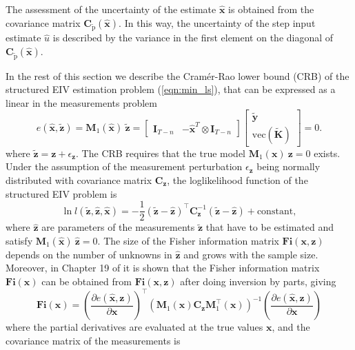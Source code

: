 The assessment of the uncertainty of the estimate $\widehat{\mathbf{x}}$ is obtained from the covariance matrix $\mathrm{\mathbf{C}}_{\widetilde{\mathrm{p}}} \left( \widehat{\mathbf{x}} \right)$. In this way, the uncertainty of the step input estimate $\widehat{u}$ is described by the variance in the first element on the diagonal of $\mathrm{\mathbf{C}}_{\widetilde{\mathrm{p}}} \left( \widehat{\mathbf{x}} \right)$.

In the rest of this section we describe the Cram\'er-Rao lower bound (CRB) of the structured EIV estimation problem (\ref{eqn:min_ls}), that can be expressed as a linear in the measurements problem \cite{Pintelon12Book}
\begin{equation} e (\widehat{\mathbf{x}}, \widetilde{\mathbf{z}}) = \mathbf{M}_1( \widehat{\mathbf{x}} ) \ \widetilde{\mathbf{z}} = \begin{bmatrix} \mathbf{I}_{T-n} & - \widehat{\mathbf{x}}^T \otimes \mathbf{I}_{T-n} \end{bmatrix} \begin{bmatrix} \widetilde{\mathbf{y}} \\ \mathrm{vec} ( \widetilde{\mathbf{K}} ) \end{bmatrix} = 0 . \label{eqn:M1vecyK} \end{equation}
where $\widetilde{\mathbf{z}} = \mathbf{z} + \epsilon_{\mathbf{z}}$.
The CRB requires that the true model $\mathbf{M}_1( \mathbf{x} ) \ \mathbf{z} = 0$ exists.
Under the assumption of the measurement perturbation $\epsilon_{\mathbf{z}}$ being normally distributed with covariance matrix $\mathbf{C}_{\mathbf{z}}$, the loglikelihood function of the structured EIV problem is
\begin{equation} \ln{ l(\widetilde{\mathbf{z}}, \widehat{\mathbf{z}}, \widehat{\mathbf{x}}) } = - \frac{1}{2} \left( \widetilde{\mathbf{z}} - \widehat{\mathbf{z}} \right)^\top \mathbf{C}_{\mathbf{z}}^{-1} \left( \widetilde{\mathbf{z}} - \widehat{\mathbf{z}} \right) + \mathrm{constant}, \end{equation}
where $\widehat{\mathbf{z}}$ are parameters of the measurements $\widetilde{\mathbf{z}}$ that have to be estimated and satisfy $\mathbf{M}_1( \widehat{\mathbf{x}} ) \ \widehat{\mathbf{z}} = 0$.
The size of the Fisher information matrix $\mathbf{Fi}(\mathbf{x}, \mathbf{z})$ depends on the number of unknowns in $\widehat{\mathbf{z}}$ and grows with the sample size.
Moreover, in Chapter 19 of \cite{Pintelon12Book} it is shown that the Fisher information matrix $\mathbf{Fi}(\mathbf{x})$ can be obtained from $\mathbf{Fi}(\mathbf{x}, \mathbf{z})$ after doing inversion by parts, giving
\begin{equation} \mathbf{Fi}(\mathbf{x}) = \left( \frac{\partial e (\widehat{\mathbf{x}}, \mathbf{z}) }{\partial \mathbf{x} } \right)^\top \left( \mathbf{M}_1( \mathbf{x} ) \mathbf{C}_{\mathbf{z}}  \mathbf{M}_1^\top( \mathbf{x} ) \right)^{-1}  \left( \frac{\partial e (\widehat{\mathbf{x}}, \mathbf{z}) }{\partial \mathbf{x} } \right) 
 \label{eqn:FIM}   \end{equation} 
where the partial derivatives are evaluated at the true values $\mathbf{x}$, and the covariance matrix of the measurements is


